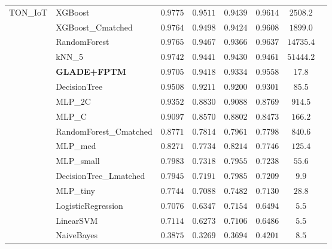\documentclass[journal,10pt]{IEEEtran}
\begin{document}
\begin{longtable}{llcccccr}
\multirow{16}{*}{TON\_IoT}
 & XGBoost                & $0.9775$ & $0.9511$ & $0.9439$ & $0.9614$ & $2508.2$   \\
 & XGBoost\_Cmatched      & $0.9764$ & $0.9498$ & $0.9424$ & $0.9608$ & $1899.0$   \\
 & RandomForest           & $0.9765$ & $0.9467$ & $0.9366$ & $0.9637$ & $14735.4$  \\
 & kNN\_5                 & $0.9742$ & $0.9441$ & $0.9430$ & $0.9461$ & $51444.2$  \\
 & \textbf{GLADE+FPTM}    & $\mathbf{0.9705}$ & $\mathbf{0.9418}$ & $\mathbf{0.9334}$ & $\mathbf{0.9558}$ & $\mathbf{17.8}$ \\
 & DecisionTree           & $0.9508$ & $0.9211$ & $0.9200$ & $0.9301$ & $85.5$     \\
 & MLP\_2C                & $0.9352$ & $0.8830$ & $0.9088$ & $0.8769$ & $914.5$    \\
 & MLP\_C                 & $0.9097$ & $0.8570$ & $0.8802$ & $0.8473$ & $166.2$    \\
 & RandomForest\_Cmatched & $0.8771$ & $0.7814$ & $0.7961$ & $0.7798$ & $840.6$    \\
 & MLP\_med               & $0.8271$ & $0.7734$ & $0.8214$ & $0.7746$ & $125.4$    \\
 & MLP\_small             & $0.7983$ & $0.7318$ & $0.7955$ & $0.7238$ & $55.6$     \\
 & DecisionTree\_Lmatched & $0.7945$ & $0.7191$ & $0.7985$ & $0.7209$ & $9.9$      \\
 & MLP\_tiny              & $0.7744$ & $0.7088$ & $0.7482$ & $0.7130$ & $28.8$     \\
 & LogisticRegression     & $0.7076$ & $0.6347$ & $0.7154$ & $0.6494$ & $5.5$      \\
 & LinearSVM              & $0.7114$ & $0.6273$ & $0.7106$ & $0.6486$ & $5.5$      \\
 & NaiveBayes             & $0.3875$ & $0.3269$ & $0.3694$ & $0.4201$ & $8.5$      \\
\midrule


\end{longtable}
\end{document}
